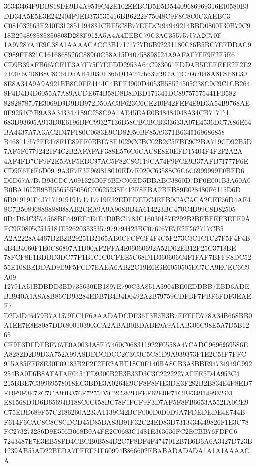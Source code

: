 \documentclass[UTF8,fontset=fandol,zihao=-4,a4paper]{ctexart}
\begin{document}
{{36343464F9DB818DE9D4A9539C42E102EEBCD5D5D54409686969316E10580B3DD34A5E5E3E242404F9EB373535416BB6222F75048C9F8C8C0C3AEBC3
C081032563E240E312851194881CBE5C8B77EEDC494949214BBD0800F30B79C918B294898585850803D288F912A5A4A4DEBC79C3AC35575757A2C70F
1A97287A4E9C38A1AAAACACC3B17171727D6B92231180C86B5BC7EFDDAC9C989FE821C1616868526C88960C58A15D40758898924A9AFAF7FF9F2E5E6
CD9B39AFB667CF1E3A7F75F7EEDD2953A64C983061EDDAB5EEEEEE2E2E2EF3E6CD8B8C8C64D5AB41030F366DDA247663949C9C4C7667048A8E8E8E30
8E8A34A9A9A921BB8C0FF4444C4BFE4900D4053B58524505C38C9C9C1CB2648F4D4D4D6055A7A89ACDE674B58D8D8DBD171341DC89757575441FB582
8282878707E3069D9D9DB972D50AC3F623C6CE210F42FEF4E9D3A54B9768AE0F9251C7B9A3A343347189C258C9A1AE45EAE0B48484048A34CB717171
683D93605A913D0E6196BFC99327136B58CBCBCB333633A07E4536DC7A86E64BA4437A7A3AC2D47F180C0683E9CD82050BF85A9371B6340169686858
B468117572FE478F1E89EF0BBE78F1029CCBC02B2C5FBE9C2BA719CD92B5D7AF5F67792421F4C2B2AFAFAF388E576C6CAC8E8E0EFD15404F4F2F2A2A
4AF4FD7CF9F2E5FAF5EBC97AC5F82C8C119CA74F9FCE9B37AFB71777F6ECD9E6E6E6D0919A3F7F3E969818010ED7E020C63588C6C6C6999999E0BFD6
D6D67A7B7B93CDCA091326B0F6BDC00ED5BBABC3860D7BF0E001B3A60A0B0BA1692B98B5565555056C00625238E412F8EBAFBFB89E028480F6116D6D
6D919191F43717191919171717719F32EDEDEDC4EFB0CACACA2CEF36D4AF48C7B50896888888088AB2CEA9A9A968BB4A614223BC470C4D99C8D82505
0D4D64C3574568BE449EE4E4E4D0BC1783C16030187E292B2BFBFEFBEFE9AFC9E0805C515181E526203535357979794423BC076767E7E2E262717CB5
A2A2228A4467B2B2B29251B2165AB0CFCFCF4F4C5F273C3C1C1C27F5F4F4B4B4B4060F1E0C86897A1D00AF2FFA4E06060692A52D02EB12F25C3718BE
78FCF8B1BDBD3DC77F1B1C1C0CFEE5C68D1B060606C4F1FAF7BFFF8DC5255E108BEDDAD9D9F5FCD7EAEA6AB22C19E6E6E6050505EC7CA9ECEC6C9A09
12791A51BDBDD3BD735630EB1897E790C3A851A3904BE0EDDBB7EBD6ADEBB940A1A8A8B86CD93284EDB7B4B4D0492A2B79759CDFBF7FBF6FDF3EAEF7
D2D4D46479B7A1579EC1F6AAADADCDF36F3B3B3B7FFFFD778A34B668BB0A1EE7E8E8087DD6800103903CA2ABAB0BDABE9A9A1AB306C98E5A7D5B1265
CF9E3DFDFBF767E0A0034A8E77460C068311922F0558A47CADC9696969586EA8282D2D9D3A752A99A8DDDCDCC2C3C3C5C81D9A939373F1E2C51F7FFC
915A85FEF8E30F09183B2F2F2FE2ABD18C0F140BA8CB3A8BBE94734949C992254BA0D6B8AFAFAF0454FD9300B2B3B33D3C3C2222227AFEE5D4A953C4
215BBE7C39969578018EC3BDE3A0264E9CF8F8F1E3DE3F282B2B834E4F8ED7EBF9F3E72C7CA99B376F7275D5C2C282DFEF62E0F71CBF349149932631
E81568D0D6D65694B188C0C658BC78F1FCF9F3D7AF5F8FB6653A5521A0CE9C75EBD689F57C2186260A233A1139C42BCF000D0D0D9A7FDEDEDE4E744B
F614F6CAC8C8C8CDCD45D85BA83B91F32C24ED83D7313434449826F1E3C78FC273273286D9E556B068B0A4FE2C0683C1481E363636FC2ECBB76FDFC6
7243487E7E3EB58FD4CBCB0B584D2C7F8BF4F4747012B7B6B6A6A3427D723B1239AB56AD22BEDA7FFEF31F60994B866602EBABADADADA1A1A1AAAACA
}}
\end{document}
